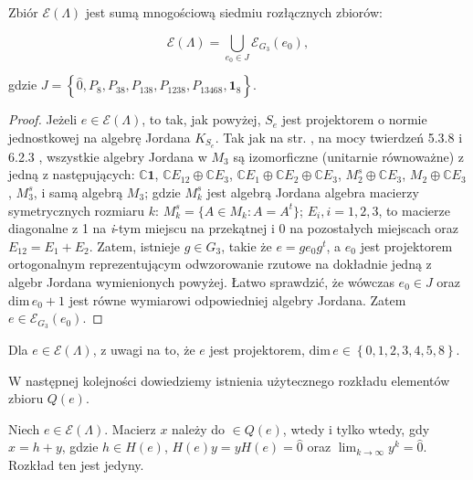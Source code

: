 {\begin{Theorem}
\label{thm:Idempotents}
Zbiór $\mathcal{E}(\Lambda)$
jest sumą mnogościową siedmiu rozłącznych zbiorów:
    \begin{linenomath*}
 \begin{equation}
        \mathcal{E}(\Lambda) = \bigcup \limits_{e_{0} \in J} \mathcal{E}_{G_{3}}(e_{0}),
     \end{equation}
\end{linenomath*}
    gdzie $J = \left \{ \hat{0}, P_{8}, P_{38}, P_{138}, P_{1238}, P_{13468}, \mathbf{1}_{8} \right \}$.
\end{Theorem}
\begin{proof}
Jeżeli $e \in \mathcal{E}(\Lambda)$, to tak, jak powyżej, $S_{e}$
jest projektorem o normie jednostkowej na algebrę Jordana $K_{S_{e}}$.
Tak jak na str. \pageref{page:allpossibleJalg},
na mocy twierdzeń 5.3.8 i 6.2.3 \cite{Hanche1984},
wszystkie algebry Jordana w $M_{3}$ są izomorficzne (unitarnie równoważne) z
jedną z następujących:
    $\mathbb{C}\mathbf{1}$,
    $\mathbb{C} E_{12} \oplus \mathbb{C} E_{3}$,
    $\mathbb{C} E_{1} \oplus \mathbb{C} E_{2} \oplus \mathbb{C} E_{3}$,
    $M_{2}^{s} \oplus \mathbb{C} E_{3}$,
    $M_{2} \oplus \mathbb{C} E_{3}$,
    $M_{3}^{s}$,
    i
    samą algebrą $M_{3}$;
gdzie $M_{k}^{s}$ jest algebrą Jordana algebra macierzy symetrycznych rozmiaru
$k$: $M_{k}^{s} = \{ A \in M_{k}: A = A^{t} \}$;
    $E_{i}, i = 1,2,3$, to macierze diagonalne z 1 na \emph{i}-tym miejscu na
    przekątnej i 0 na pozostałych miejscach oraz $E_{12} = E_{1} + E_{2}$.
Zatem, istnieje $g \in G_{3}$, takie że
    $e = g e_{0} g ^{t}$, a $e_{0}$ jest projektorem ortogonalnym
    reprezentującym odwzorowanie rzutowe na dokładnie jedną z algebr Jordana
    wymienionych powyżej.
Łatwo sprawdzić, że wówczas $e_{0} \in J$ oraz
$\text{dim} \, e_{0} + 1$ jest równe wymiarowi odpowiedniej algebry Jordana.
Zatem $e \in \mathcal{E}_{G_{3}}(e_{0})$.
\end{proof}

\begin{Corollary}
\label{cor:q}
    Dla $e \in \mathcal{E}(\Lambda)$, z uwagi na to, że $e$ jest projektorem,
    $\text{dim} \, e
    \in \left \{ 0,1,2,3,4,5,8 \right \}$.
\end{Corollary}

W następnej kolejności dowiedziemy istnienia użytecznego rozkładu elementów
zbioru $Q(e)$.

\begin{Lemma}
\label{lem:decomposition}
    Niech $e \in \mathcal{E}(\Lambda)$.
    Macierz $x$ należy do $\in Q(e)$, wtedy i tylko wtedy, gdy
    $x = h + y$, gdzie
    $h \in H(e)$, $H(e) y = y H(e) = \hat{0}$ oraz
    $\lim_{k \rightarrow \infty} y^{k} = \hat{0}$.
    Rozkład ten jest jedyny.
\end{Lemma}

}
